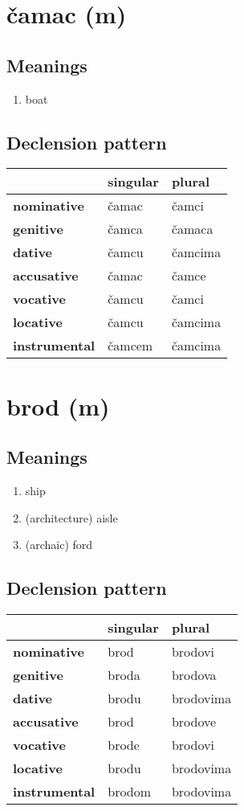 \filbreak
\section{čamac (m)}
\subsection*{Meanings}
\begin{enumerate}
\item boat
\end{enumerate}
\subsection*{Declension pattern}
\begin{tabularx}{\linewidth}{Xll}
\toprule
{} & singular &   plural \\
\midrule
\textbf{nominative  } &    čamac &    čamci \\
\textbf{genitive    } &    čamca &   čamaca \\
\textbf{dative      } &    čamcu &  čamcima \\
\textbf{accusative  } &    čamac &    čamce \\
\textbf{vocative    } &    čamcu &    čamci \\
\textbf{locative    } &    čamcu &  čamcima \\
\textbf{instrumental} &   čamcem &  čamcima \\
\bottomrule
\end{tabularx}

\filbreak
\section{brod (m)}
\subsection*{Meanings}
\begin{enumerate}
\item ship
\item (architecture) aisle
\item (archaic) ford
\end{enumerate}
\subsection*{Declension pattern}
\begin{tabularx}{\linewidth}{Xll}
\toprule
{} & singular &     plural \\
\midrule
\textbf{nominative  } &     brod &    brodovi \\
\textbf{genitive    } &    broda &    brodova \\
\textbf{dative      } &    brodu &  brodovima \\
\textbf{accusative  } &     brod &    brodove \\
\textbf{vocative    } &    brode &    brodovi \\
\textbf{locative    } &    brodu &  brodovima \\
\textbf{instrumental} &   brodom &  brodovima \\
\bottomrule
\end{tabularx}

